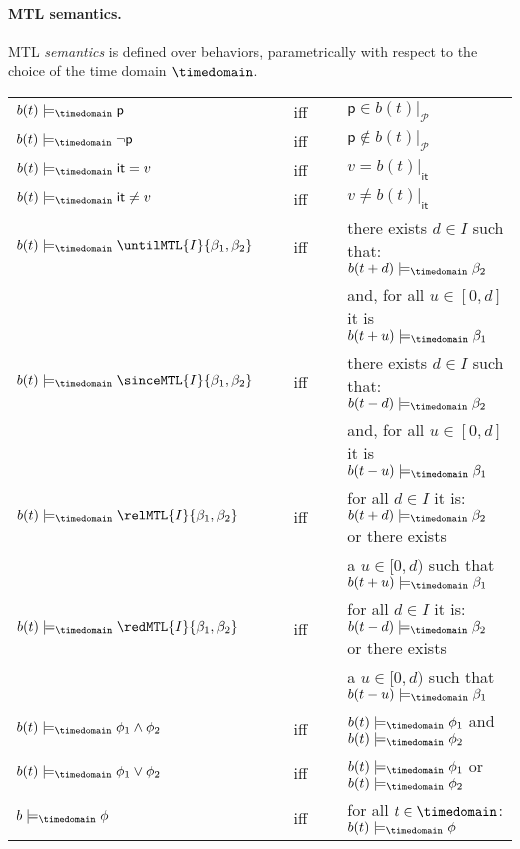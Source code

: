 \documentclass[a4paper]{article}
\newcommand{\pp}{\mathsf{p}}
\newcommand{\Pcal}{\mathcal{P}}
\newcommand{\modelstime}[1]{\models_{#1}}
\newcommand{\mdt}{\modelstime{\timedomain}}
\newcommand{\iit}{\mathsf{it}}
\theoremstyle{plain}
\theoremstyle{definition}
\begin{document}
\paragraph{MTL semantics.}
MTL \emph{semantics} is defined over behaviors, parametrically with respect to the choice of the time domain $\timedomain$.\\
\begin{tabular}{l c l}
  $b(t) \mdt \pp$ & \ \ \ iff\ \ \ &  $\pp \in b(t)|_{\Pcal}$ \\
  $b(t) \mdt \neg \pp$ & \ \ \ iff\ \ \ &  $\pp \not\in b(t)|_{\Pcal}$ \\

  $b(t) \mdt \iit = v$ & \ \ \ iff\ \ \ &  $v =  b(t)|_{\iit}$ \\
  $b(t) \mdt \iit \neq v$ & \ \ \ iff\ \ \ &  $v \neq  b(t)|_{\iit}$ \\

  $b(t) \mdt \untilMTL{I}{\beta_1, \beta_2}$ & \ \ \ iff\ \ \ &
            there exists $d \in I$ such that: $b(t+d) \mdt \beta_2$  \\
  &  &      and, for all $u \in [0, d]$ it is $b(t+u) \mdt \beta_1$  \\

  $b(t) \mdt \sinceMTL{I}{\beta_1, \beta_2}$ & \ \ \ iff\ \ \ &
            there exists $d \in I$ such that: $b(t-d) \mdt \beta_2$  \\
  &  &      and, for all $u \in [0, d]$ it is $b(t-u) \mdt \beta_1$  \\

  $b(t) \mdt \relMTL{I}{\beta_1, \beta_2}$ & \ \ \ iff\ \ \ &
            for all $d \in I$ it is: $b(t+d) \mdt \beta_2$ or there exists \\
  &  &       a $u \in [0, d)$ such that $b(t+u) \mdt \beta_1$  \\

  $b(t) \mdt \redMTL{I}{\beta_1, \beta_2}$ & \ \ \ iff\ \ \ &
            for all $d \in I$ it is: $b(t-d) \mdt \beta_2$ or there exists \\
  &  &       a $u \in [0, d)$ such that $b(t-u) \mdt \beta_1$  \\

  $b(t) \mdt \phi_1 \wedge \phi_2$  & \ \ \ iff\ \ \ & $b(t) \mdt \phi_1$ and $b(t) \mdt \phi_2$  \\

  $b(t) \mdt \phi_1 \vee \phi_2$  & \ \ \ iff\ \ \ & $b(t) \mdt \phi_1$ or $b(t) \mdt \phi_2$  \\

  $b \mdt \phi$  & \ \ \ iff\ \ \ &  for all $t \in \timedomain$: $b(t) \mdt \phi$
\end{tabular}
\end{document}
